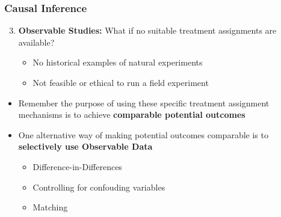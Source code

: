 \documentclass[xcolor=x11names,compress]{beamer}\usepackage[]{graphicx}\usepackage[]{color}
\renewcommand{\(}{\begin{columns}}
\renewcommand{\)}{\end{columns}}
\newcommand{\<}[1]{\begin{column}{#1}}
\renewcommand{\>}{\end{column}}
\begin{document}
\begin{frame}
\frametitle{Causal Inference}
\begin{enumerate}
\setcounter{enumi}{2}
\item \textbf{Observable Studies:} What if no suitable treatment assignments are available?
\begin{itemize}
\item No historical examples of natural experiments
\item Not feasible or ethical to run a field experiment
\end{itemize}
\end{enumerate}
\begin{itemize}
\item Remember the purpose of using these specific treatment assignment mechanisms is to achieve \textbf{comparable potential outcomes}
\item One alternative way of making potential outcomes comparable is to \textbf{selectively use Observable Data}
\begin{itemize}
\item Difference-in-Differences
\item Controlling for confouding variables
\item Matching
\end{itemize}
\end{itemize}
\end{frame}
\end{document}
